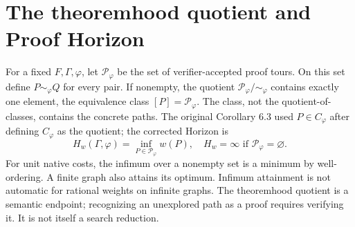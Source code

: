 \documentclass[11pt]{article}
\theoremstyle{definition}\newtheorem{definition}[theorem]{Definition}\newtheorem{example}[theorem]{Example}\newtheorem{conjecture}[theorem]{Conjecture}
\begin{document}
\section{The theoremhood quotient and Proof Horizon}
For a fixed $F,\Gamma,\varphi$, let $\mathcal P_\varphi$ be the set of verifier-accepted proof tours. On this set define $P\sim_\varphi Q$ for every pair. If nonempty, the quotient $\mathcal P_\varphi/\sim_\varphi$ contains exactly one element, the equivalence class $[P]=\mathcal P_\varphi$. The class, not the quotient-of-classes, contains the concrete paths. The original Corollary 6.3 used $P\in C_\varphi$ after defining $C_\varphi$ as the quotient; the corrected Horizon is
\[H_w(\Gamma,\varphi)=\inf_{P\in\mathcal P_\varphi}w(P),\quad H_w=\infty\text{ if }\mathcal P_\varphi=\varnothing.\]
For unit native costs, the infimum over a nonempty set is a minimum by well-ordering. A finite graph also attains its optimum. Infimum attainment is not automatic for rational weights on infinite graphs. The theoremhood quotient is a semantic endpoint; recognizing an unexplored path as a proof requires verifying it. It is not itself a search reduction.
\end{document}
